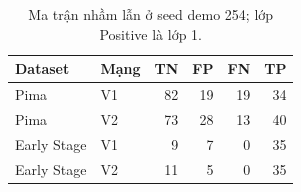 \par\FloatBarrier\begin{table}[H]\centering\small{}\setlength{\tabcolsep}{5pt}
\caption{Ma trận nhầm lẫn ở seed demo 254; lớp Positive là lớp 1.}\begin{tabular}{llrrrr}\toprule
Dataset & Mạng & TN & FP & FN & TP\\\midrule
Pima & V1 & 82 & 19 & 19 & 34\\
Pima & V2 & 73 & 28 & 13 & 40\\
Early Stage & V1 & 9 & 7 & 0 & 35\\
Early Stage & V2 & 11 & 5 & 0 & 35\\\bottomrule\end{tabular}\end{table}
